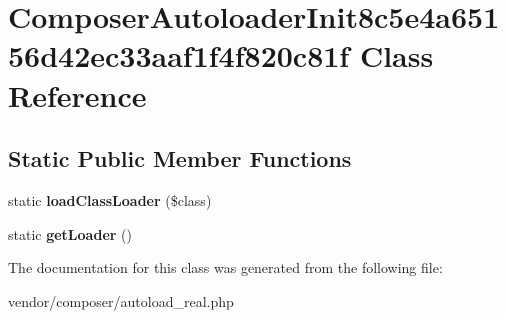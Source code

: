 \hypertarget{classComposerAutoloaderInit8c5e4a65156d42ec33aaf1f4f820c81f}{}\section{Composer\+Autoloader\+Init8c5e4a65156d42ec33aaf1f4f820c81f Class Reference}
\label{classComposerAutoloaderInit8c5e4a65156d42ec33aaf1f4f820c81f}
\subsection*{Static Public Member Functions}
\begin{DoxyCompactItemize}
\item 
\mbox{\label{classComposerAutoloaderInit8c5e4a65156d42ec33aaf1f4f820c81f_a0dd38d01c45445e2f5ee6b0a27ee9253}} 
static {\bfseries load\+Class\+Loader} (\$class)
\item 
\mbox{\label{classComposerAutoloaderInit8c5e4a65156d42ec33aaf1f4f820c81f_a2a412cb6c15e2c2e84a0761bb3f94568}} 
static {\bfseries get\+Loader} ()
\end{DoxyCompactItemize}


The documentation for this class was generated from the following file\+:\begin{DoxyCompactItemize}
\item 
vendor/composer/autoload\+\_\+real.\+php\end{DoxyCompactItemize}
